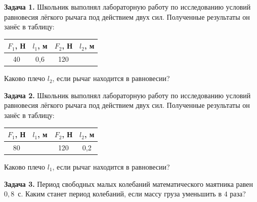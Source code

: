 
\begin{taskbasic}[code={\label{task:dem26_v1_n4}}]
\textbf{Задача 1.} Школьник выполнял лабораторную работу по исследованию условий равновесия лёгкого рычага под действием двух сил. Полученные результаты он занёс в таблицу:
\begin{center}
\begin{tabular}{|c|c|c|c|}
\hline
$F_{1}$, Н & $l_{1}$, м & $F_{2}$, Н & $l_{2}$, м \\ \hline
40 & 0,6 & 120 & \\ \hline
\end{tabular}
\end{center}
Каково плечо $l_{2}$, если рычаг находится в равновесии?

\end{taskbasic}

\begin{taskbasic}[code={\label{task:dem26_v2_n4}}]
\textbf{Задача 2.} Школьник выполнял лабораторную работу по исследованию условий равновесия лёгкого рычага под действием двух сил. Полученные результаты он занёс в таблицу:
\begin{center}
\begin{tabular}{|c|c|c|c|}
\hline
$F_{1}$, Н & $l_{1}$, м & $F_{2}$, Н & $l_{2}$, м \\ \hline
80 & & 120 & 0,2 \\ \hline
\end{tabular}
\end{center}
Каково плечо $l_{1}$, если рычаг находится в равновесии?

\end{taskbasic}

\begin{taskbasic}[code={\label{task:dem26_v3_n4}}]
\textbf{Задача 3.} Период свободных малых колебаний математического маятника равен $0{,}8$~с. Каким станет период колебаний, если массу груза уменьшить в $4$ раза?

\end{taskbasic}

